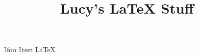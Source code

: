 \begin{html}
    \begin{head}
        \title{Lucy's LaTeX Stuff}
    \end{head}

    \begin{body}
     \h1{foo}
     \h1{test}
     \LaTeX
    \end{body}
\end{html}